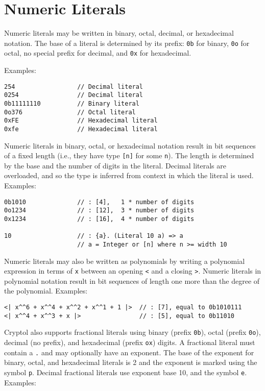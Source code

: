 \section{Numeric Literals}\label{numeric-literals}

Numeric literals may be written in binary, octal, decimal, or
hexadecimal notation. The base of a literal is determined by its prefix:
\texttt{0b} for binary, \texttt{0o} for octal, no special prefix for
decimal, and \texttt{0x} for hexadecimal.

Examples:

\begin{verbatim}
254                 // Decimal literal
0254                // Decimal literal
0b11111110          // Binary literal
0o376               // Octal literal
0xFE                // Hexadecimal literal
0xfe                // Hexadecimal literal
\end{verbatim}

Numeric literals in binary, octal, or hexadecimal notation result in bit
sequences of a fixed length (i.e., they have type \texttt{{[}n{]}} for
some \texttt{n}). The length is determined by the base and the number of
digits in the literal. Decimal literals are overloaded, and so the type
is inferred from context in which the literal is used. Examples:

\begin{verbatim}
0b1010              // : [4],   1 * number of digits
0o1234              // : [12],  3 * number of digits
0x1234              // : [16],  4 * number of digits

10                  // : {a}. (Literal 10 a) => a
                    // a = Integer or [n] where n >= width 10
\end{verbatim}

Numeric literals may also be written as polynomials by writing a
polynomial expression in terms of \texttt{x} between an opening
\texttt{\textless{}\textbar{}} and a closing
\texttt{\textbar{}\textgreater{}}. Numeric literals in polynomial
notation result in bit sequences of length one more than the degree of
the polynomial. Examples:

\begin{verbatim}
<| x^^6 + x^^4 + x^^2 + x^^1 + 1 |>  // : [7], equal to 0b1010111
<| x^^4 + x^^3 + x |>                // : [5], equal to 0b11010
\end{verbatim}

Cryptol also supports fractional literals using binary (prefix
\texttt{0b}), octal (prefix \texttt{0o}), decimal (no prefix), and
hexadecimal (prefix \texttt{ox}) digits. A fractional literal must
contain a \texttt{.} and may optionally have an exponent. The base of
the exponent for binary, octal, and hexadecimal literals is 2 and the
exponent is marked using the symbol \texttt{p}. Decimal fractional
literals use exponent base 10, and the symbol \texttt{e}. Examples:

